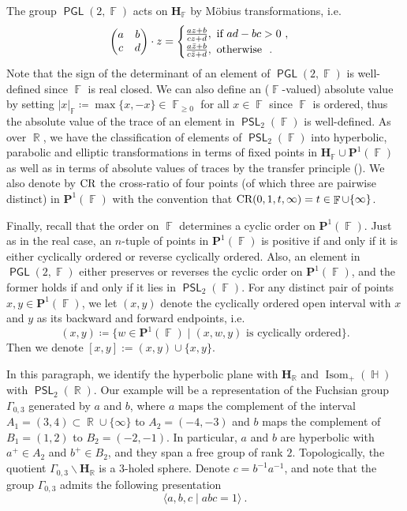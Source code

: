 \documentclass{amsart}
\theoremstyle{plain}
\theoremstyle{definition}
\DeclareMathOperator{\PSL}{\mathsf{PSL}}
\DeclareMathOperator{\PGL}{\mathsf{PGL}}
\DeclareMathOperator{\Isom}{Isom}
\DeclareMathOperator{\Fb}{{\mathbb{F}}}
\DeclareMathOperator{\Hb}{\mathbb{H}}
\DeclareMathOperator{\Rb}{{\mathbb{R}}}
\newcommand{\1}{\mathbf{1}}
\begin{document}
The group $\PGL(2,\Fb)$ acts on $\mathbf{H}_{\Fb}$ by M\"obius transformations, i.e.\
\[\begin{pmatrix}
    a & b \\
    c & d
\end{pmatrix} \cdot z = \begin{cases}
    \frac{az+b}{cz+d}, \textnormal{ if } ad-bc>0~,\\
    \frac{a\bar{z}+b}{c\bar{z}+d}, \textnormal{ otherwise }~.
\end{cases}\]
Note that the sign of the determinant of an element of $\PGL(2,\Fb)$ is well-defined since $\Fb$ is real closed.
We can also define an ($\Fb$-valued) absolute value by setting $\vert x \vert_{\Fb} \coloneqq \max\{x,-x\} \in \Fb_{\geq 0}$ for all $x \in \Fb$ since $\Fb$ is ordered, thus the absolute value of the trace of an element in $\PSL_2(\Fb)$ is well-defined.
As over $\Rb$, we have the classification of elements of $\PSL_2(\Fb)$ into hyperbolic, parabolic and elliptic transformations in terms of fixed points in $\mathbf{H}_{\Fb} \cup \mathbf{P}^1(\Fb)$ as well as in terms of absolute values of traces by the transfer principle ().
We also denote by $\textnormal{CR}$ the cross-ratio of four points (of which three are pairwise distinct) in $\mathbf{P}^1(\Fb)$ with the convention that $\textnormal{CR}(0,1,t,\infty)=t\in\Fb\cup\{\infty\}$. 

Finally, recall that the order on $\Fb$ determines a cyclic order on $\mathbf{P}^1(\Fb)$. Just as in the real case, an $n$-tuple of points in $\mathbf{P}^1(\Fb)$ is positive if and only if it is either cyclically ordered or reverse cyclically ordered. Also, an element in $\PGL(2,\Fb)$ either preserves or reverses the cyclic order on $\mathbf{P}^1(\Fb)$, and the former holds if and only if it lies in $\PSL_2(\Fb)$. For any distinct pair of points $x,y\in\mathbf{P}^1(\Fb)$, we let $(x,y)$ denote the cyclically ordered open interval with $x$ and $y$ as its backward and forward endpoints, i.e.
\[(x,y)\coloneqq \{w\in\mathbf{P}^1(\Fb) \mid (x,w,y)\text{ is cyclically ordered}\}.\]
Then we denote $[x,y]:=(x,y)\cup\{x,y\}$.

In this paragraph, we identify the hyperbolic plane with $\mathbf{H}_{\Rb}$ and $\Isom_+(\Hb)$ with $\PSL_2(\Rb)$.
Our example will be a representation of the Fuchsian group $\Gamma_{0,3}$ generated by $a$ and $b$, where $a$ maps the complement of the interval $A_1 = (3,4) \subset \Rb\cup\{\infty\}$ to $A_2 = (-4,-3)$ and $b$ maps the complement of $B_1 = (1,2)$ to $B_2= (-2,-1)$. In particular, $a$ and $b$ are hyperbolic with $a^+\in A_2$ and $b^+\in B_2$, and they span a free group of rank $2$. Topologically, the quotient $\Gamma_{0,3} \backslash \mathbf{H}_{\Rb}$ is a $3$-holed sphere. Denote $c = b^{-1}a^{-1}$, and note that the group $\Gamma_{0,3}$ admits the following presentation
\[\langle a,b,c \mid abc=1\rangle~.\]
\end{document}
